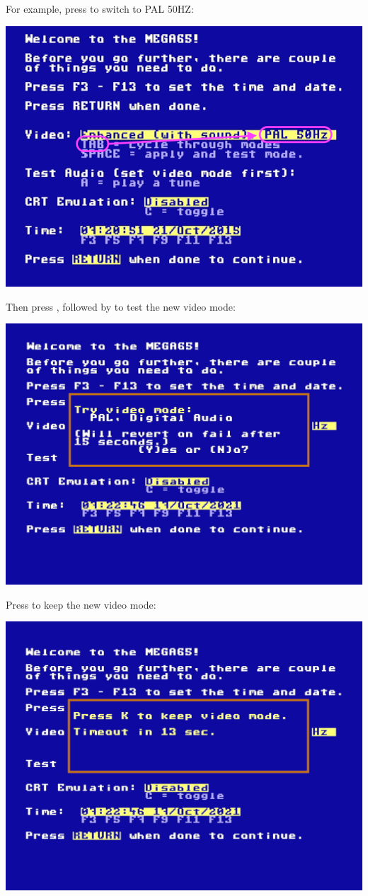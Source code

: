 For example, press  to switch to PAL 50HZ:
\begin{center}
  \includegraphics[width=0.7\linewidth]{images/img011_final_boot_02.png}
\end{center}

Then press  , followed by  to test the new video mode:

\begin{center}
  \includegraphics[trim= 15mm 10mm 10mm 15mm,clip,width=0.7\linewidth]{images/img011_final_boot_03.png}
\end{center}

Press  to keep the new video mode:

\begin{center}
  \includegraphics[trim= 20mm 20mm 10mm 25mm,clip,width=0.7\linewidth]{images/img011_final_boot_04.png}
\end{center}

